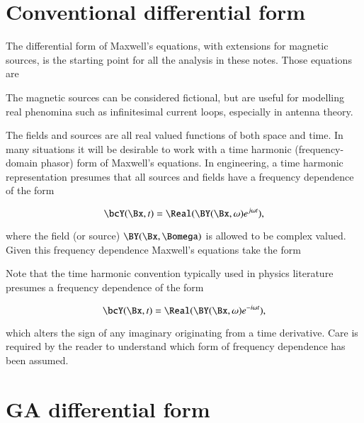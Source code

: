 %
%
\section{Conventional differential form}

The differential form of Maxwell's equations, with extensions for magnetic sources, is the starting point for all the analysis in these notes.  Those equations are



The magnetic sources can be considered fictional, but are useful for modelling real phenomina such as infinitesimal current loops, especially in antenna theory.



The fields and sources are all real valued functions of both space and time.  In many situations it will be desirable to work with a time harmonic (frequency-domain phasor) form of Maxwell's equations.  In engineering, a time harmonic representation presumes that all sources and fields have a frequency dependence of the form

\begin{dmath}\label{eqn:maxwellsEquations:20}
\bcY(\Bx, t) = \Real( \BY(\Bx, \omega) e^{j\omega t} ),
\end{dmath}

where the field (or source) \( \BY(\Bx, \Bomega) \) is allowed to be complex valued.  Given this frequency dependence Maxwell's equations take the form



Note that the time harmonic convention typically used in physics literature presumes a frequency dependence of the form

\begin{dmath}\label{eqn:maxwellsEquations:40}
\bcY(\Bx, t) = \Real( \BY(\Bx, \omega) e^{-i\omega t} ),
\end{dmath}

which alters the sign of any imaginary originating from a time derivative.  Care is required by the reader to understand which form of frequency dependence has been assumed.

\section{GA differential form}

